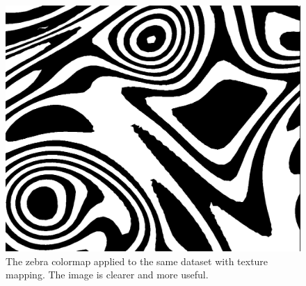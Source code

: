 		\begin{figure}[htb]
			  \centering
			  \includegraphics[scale=.2]{./content/pictures/zebra_texture.png}
			  \caption{The zebra colormap applied to the same dataset with texture mapping. The image is clearer and more useful.}
			  \label{fig:with_textures}
		\end{figure}